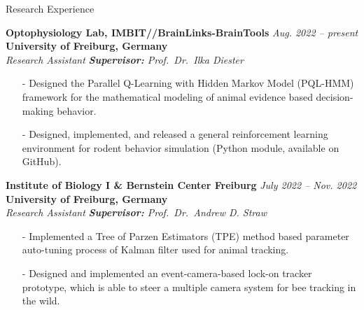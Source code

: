 \begin{rSection}{Research Experience}
    
    {\bf Optophysiology Lab, IMBIT//BrainLinks-BrainTools} \hfill {\em Aug. 2022 -- present}
    \\{\bf University of Freiburg, Germany}
    \\{\it Research Assistant} \hfill {\textit{\textbf{Supervisor:} Prof.\ Dr.\ Ilka Diester}}
    \begin{itemize}
        \item[-] Designed the Parallel Q-Learning with Hidden Markov Model (PQL-HMM) framework for the mathematical modeling of animal evidence based decision-making behavior.
        \item[-] Designed, implemented, and released a general reinforcement learning environment for rodent behavior simulation (Python module, available on GitHub).
    \end{itemize}
    
    {\bf Institute of Biology I \& Bernstein Center Freiburg} \hfill {\em July 2022 -- Nov. 2022}
    \\{\bf University of Freiburg, Germany}
    \\{\it Research Assistant} \hfill {\textit{\textbf{Supervisor:} Prof.\ Dr.\ Andrew D. Straw}}
    \begin{itemize}
        \item[-] Implemented a Tree of Parzen Estimators (TPE) method based parameter auto-tuning process of Kalman filter used for animal tracking.
        \item[-] Designed and implemented an event-camera-based lock-on tracker prototype, which is able to steer a multiple camera system for bee tracking in the wild. 
    \end{itemize}
        

\end{rSection}
